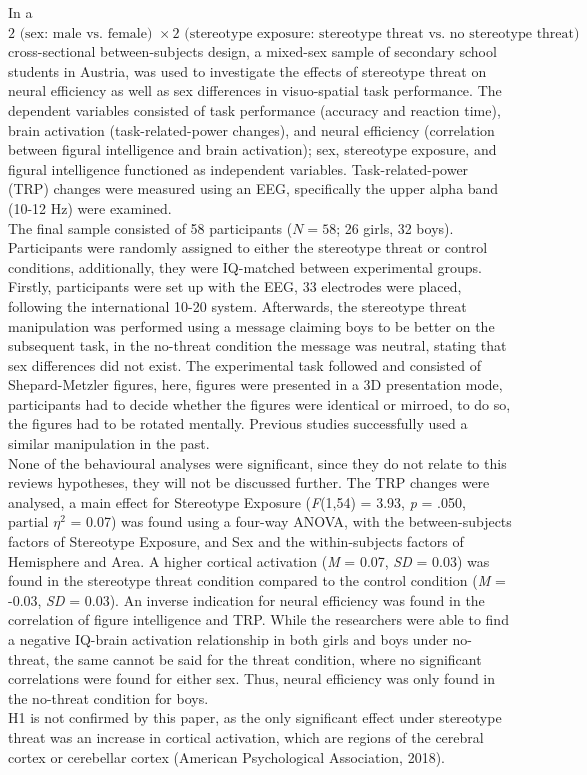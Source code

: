 \documentclass[
  stu]{apa7}
\begin{document}
In a \(2 \text{ (sex: male vs. female) } \times 2 \text{ (stereotype exposure: stereotype threat vs. no stereotype threat) }\) cross-sectional between-subjects design, a mixed-sex sample of secondary school students in Austria, was used to investigate the effects of stereotype threat on neural efficiency as well as sex differences in visuo-spatial task performance.
The dependent variables consisted of task performance (accuracy and reaction time), brain activation (task-related-power changes), and neural efficiency (correlation between figural intelligence and brain activation); sex, stereotype exposure, and figural intelligence functioned as independent variables.
Task-related-power (TRP) changes were measured using an EEG, specifically the upper alpha band (10-12 Hz) were examined.\\
The final sample consisted of 58 participants (\(N = 58\); 26 girls, 32 boys).
Participants were randomly assigned to either the stereotype threat or control conditions, additionally, they were IQ-matched between experimental groups.\\
Firstly, participants were set up with the EEG, 33 electrodes were placed, following the international 10-20 system.
Afterwards, the stereotype threat manipulation was performed using a message claiming boys to be better on the subsequent task, in the no-threat condition the message was neutral, stating that sex differences did not exist.
The experimental task followed and consisted of Shepard-Metzler figures, here, figures were presented in a 3D presentation mode, participants had to decide whether the figures were identical or mirroed, to do so, the figures had to be rotated mentally.
Previous studies successfully used a similar manipulation in the past.\\
None of the behavioural analyses were significant, since they do not relate to this reviews hypotheses, they will not be discussed further.
The TRP changes were analysed, a main effect for Stereotype Exposure (\emph{F}(1,54) = 3.93, \emph{p} = .050, \(\text{partial }\eta^{2}\) = 0.07) was found using a four-way ANOVA, with the between-subjects factors of Stereotype Exposure, and Sex and the within-subjects factors of Hemisphere and Area.
A higher cortical activation (\emph{M} = 0.07, \emph{SD} = 0.03) was found in the stereotype threat condition compared to the control condition (\emph{M} = -0.03, \emph{SD} = 0.03).
An inverse indication for neural efficiency was found in the correlation of figure intelligence and TRP.
While the researchers were able to find a negative IQ-brain activation relationship in both girls and boys under no-threat, the same cannot be said for the threat condition, where no significant correlations were found for either sex.
Thus, neural efficiency was only found in the no-threat condition for boys.\\
H1 is not confirmed by this paper, as the only significant effect under stereotype threat was an increase in cortical activation, which are regions of the cerebral cortex or cerebellar cortex (American Psychological Association, 2018).
\end{document}

